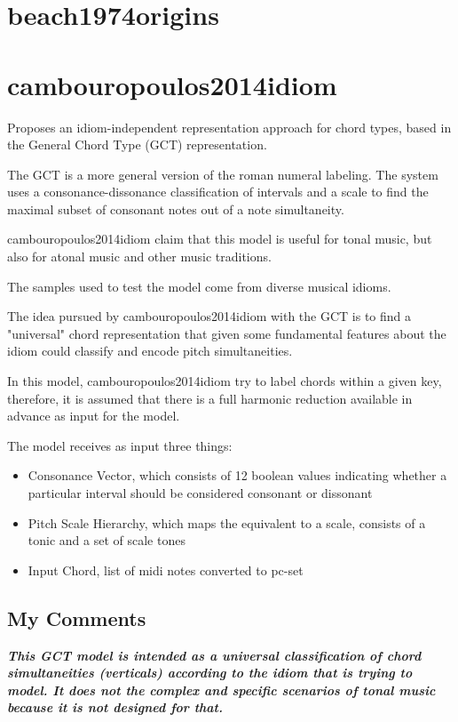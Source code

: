 	\section{beach1974origins }
	\section{cambouropoulos2014idiom }
		Proposes an idiom-independent representation approach for chord types, based in the General Chord Type (GCT) representation.

		The GCT is a more general version of the roman numeral labeling. The system uses a consonance-dissonance classification of intervals and a scale to find the maximal subset of consonant notes out of a note simultaneity.

		cambouropoulos2014idiom claim that this model is useful for tonal music, but also for atonal music and other music traditions.

		The samples used to test the model come from diverse musical idioms.

		The idea pursued by cambouropoulos2014idiom with the GCT is to find a "universal" chord representation that given some fundamental features about the idiom could classify and encode pitch simultaneities.

		In this model, cambouropoulos2014idiom try to label chords within a given key, therefore, it is assumed that there is a full harmonic reduction available in advance as input for the model.

		The model receives as input three things:
		\begin{itemize}
			\item Consonance Vector, which consists of 12 boolean values indicating whether a particular interval should be considered consonant or dissonant
			\item Pitch Scale Hierarchy, which maps the equivalent to a scale, consists of a tonic and a set of scale tones
			\item Input Chord, list of midi notes converted to pc-set
		\end{itemize}

		\subsection{My Comments}
			\emph{\textbf{
				This GCT model is intended as a universal classification of chord simultaneities (verticals) according to the idiom that is trying to model. It does not the complex and specific scenarios of tonal music because it is not designed for that.
			}}

